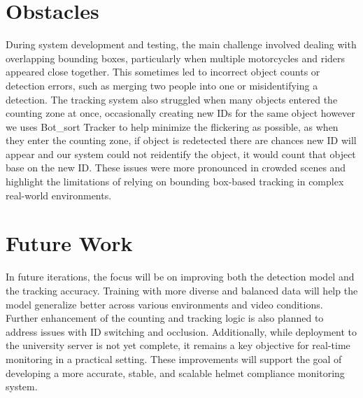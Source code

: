 \section{Obstacles}
\setlength{\parindent}{2.5em}
During system development and testing, the main challenge involved dealing with overlapping bounding boxes, particularly when multiple motorcycles and riders appeared close together. This sometimes led to incorrect object counts or detection errors, such as merging two people into one or misidentifying a detection. The tracking system also struggled when many objects entered the counting zone at once, occasionally creating new IDs for the same object however we uses Bot\_sort Tracker to help minimize the flickering as possible, as when they enter the counting zone, if object is redetected there are chances new ID will appear and our system could not reidentify the object, it would count that object base on the new ID. These issues were more pronounced in crowded scenes and highlight the limitations of relying on bounding box-based tracking in complex real-world environments.
\section{Future Work}
\setlength{\parindent}{2.5em}
In future iterations, the focus will be on improving both the detection model and the tracking accuracy. Training with more diverse and balanced data will help the model generalize better across various environments and video conditions. Further enhancement of the counting and tracking logic is also planned to address issues with ID switching and occlusion. Additionally, while deployment to the university server is not yet complete, it remains a key objective for real-time monitoring in a practical setting. These improvements will support the goal of developing a more accurate, stable, and scalable helmet compliance monitoring system.



